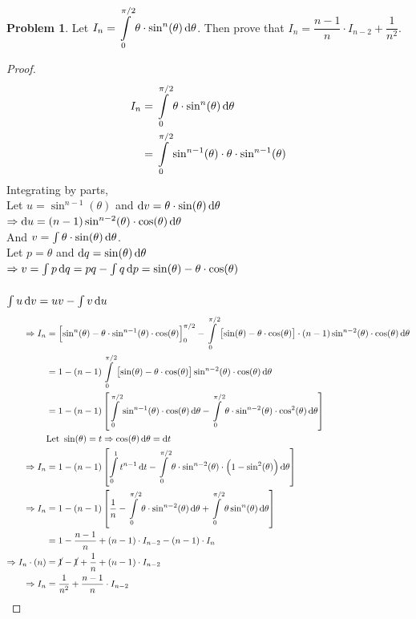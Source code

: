 \documentclass[14]{article}
\theoremstyle{definition}
\newtheorem{prob}{Problem}
\theoremstyle{case}
\begin{document}
\pagebreak
\begin{prob}
Let $I_n = \displaystyle \int\limits_0^{\pi/2} \theta \cdot \sin^{n}(\theta) \dif \theta$. Then prove that $I_n = \dfrac{n-1}{n} \cdot I_{n-2} + \dfrac1{n^2}$.
\begin{proof}
\begin{align*}
I_n &= \int\limits_0^{\pi/2} \theta \cdot \sin^{n}(\theta) \dif \theta\\
&= \int\limits_0^{\pi/2} \sin^{n-1}(\theta) \cdot \theta \cdot \sin^{n-1}(\theta)
\end{align*}
Integrating by parts,\\
Let $u = \sin^{n-1}(\theta)$ and $\dif v = \theta \cdot \sin(\theta) \dif \theta$\\
$\Rightarrow \dif u = (n-1)\sin^{n-2}(\theta) \cdot \cos(\theta) \dif \theta$\\
And $v = \int\displaystyle\theta \cdot \sin(\theta) \dif \theta$.\\
Let $p = \theta$ and $\dif q = \sin(\theta) \dif \theta$\\
$\Rightarrow v = \int p \dif q = pq - \int q \dif p = \sin(\theta) - \theta \cdot \cos(\theta)$\\\\
$\int u \dif v = uv - \int v \dif u$
\begin{align*}
\Rightarrow I_n &= \left[ \sin^n(\theta) - \theta \cdot \sin^{n-1}(\theta) \cdot \cos(\theta) \right]_0^{\pi/2} - \int\limits_0^{\pi/2} \left[\sin(\theta) - \theta \cdot \cos(\theta) \right] \cdot (n-1)\sin^{n-2}(\theta) \cdot \cos(\theta) \dif \theta\\
&= 1 - (n-1) \int\limits_0^{\pi/2} \left[\sin(\theta) - \theta \cdot \cos(\theta) \right] \sin^{n-2}(\theta) \cdot \cos(\theta) \dif \theta\\
&= 1 - (n-1) \left[ \int\limits_0^{\pi/2} \sin^{n-1}(\theta) \cdot \cos(\theta) \dif \theta - \int\limits_0^{\pi/2} \theta \cdot \sin^{n-2}(\theta) \cdot \cos^2(\theta) \dif \theta \right]\\
& \text{Let } \sin(\theta) = t \Rightarrow \cos(\theta) \dif \theta = \dif t\\
\Rightarrow I_n &= 1 - (n-1)\left[ \int\limits_0^1 t^{n-1} \dif t - \int\limits_0^{\pi/2} \theta \cdot \sin^{n-2}(\theta) \cdot \left(1- \sin^2(\theta)\right) \dif \theta \right]\\
\Rightarrow I_n &= 1 - (n-1)\left[ \dfrac1{n} - \int\limits_0^{\pi/2} \theta \cdot \sin^{n-2}(\theta) \dif \theta + \int\limits_0^{\pi/2} \theta \sin^n(\theta)  \dif \theta \right]\\
&= 1 - \dfrac{n-1}{n} + (n-1) \cdot I_{n-2} - (n-1) \cdot I_n\\
\Rightarrow I_n \cdot (n) &= \cancel{1} - \cancel{1} + \dfrac1n + (n-1) \cdot I_{n-2}\\
\Rightarrow I_n &= \dfrac1{n^2} + \dfrac{n-1}{n} \cdot I_{n-2}
\end{align*}
\end{proof}
\end{prob}
\end{document}
